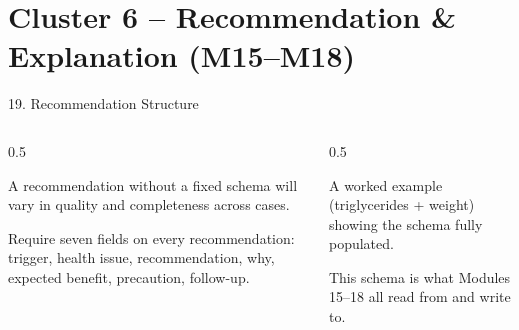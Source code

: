 \documentclass[9pt,aspectratio=169]{beamer}
\begin{document}
\section{Cluster 6 -- Recommendation \& Explanation (M15--M18)}

\begin{frame}{19. Recommendation Structure}
\begin{columns}[T,onlytextwidth]
\begin{column}{0.5\textwidth}
\begin{tcolorbox}[colback=blue!7,colframe=blue!55!black,title=\textbf{Motivation},boxrule=0.6pt,arc=1mm,left=5pt,right=5pt,top=3pt,bottom=3pt,fonttitle=\small]
\footnotesize A recommendation without a fixed schema will vary in quality and completeness across cases.
\end{tcolorbox}
\vspace{5pt}
\begin{tcolorbox}[colback=teal!7,colframe=teal!55!black,title=\textbf{Method},boxrule=0.6pt,arc=1mm,left=5pt,right=5pt,top=3pt,bottom=3pt,fonttitle=\small]
\footnotesize Require seven fields on every recommendation: trigger, health issue, recommendation, why, expected benefit, precaution, follow-up.
\end{tcolorbox}
\end{column}
\begin{column}{0.5\textwidth}
\begin{tcolorbox}[colback=green!8,colframe=green!45!black,title=\textbf{Result},boxrule=0.6pt,arc=1mm,left=5pt,right=5pt,top=3pt,bottom=3pt,fonttitle=\small]
\footnotesize A worked example (triglycerides + weight) showing the schema fully populated.
\end{tcolorbox}
\vspace{5pt}
\begin{tcolorbox}[colback=orange!10,colframe=orange!65!black,title=\textbf{Conclusion},boxrule=0.6pt,arc=1mm,left=5pt,right=5pt,top=3pt,bottom=3pt,fonttitle=\small]
\footnotesize This schema is what Modules 15--18 all read from and write to.
\end{tcolorbox}
\end{column}
\end{columns}
\end{frame}
\end{document}
